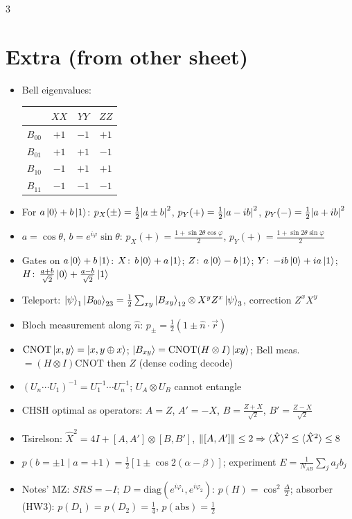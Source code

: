 \documentclass[10pt]{article}
\begin{document}
\begin{multicols*}{3}
\section{Extra (from other sheet)}
\begin{itemize}
  \item Bell eigenvalues:
  \begin{tabular}{c|ccc}
    & $XX$ & $YY$ & $ZZ$\\\hline
    $B_{00}$ & $+1$ & $-1$ & $+1$\\
    $B_{01}$ & $+1$ & $+1$ & $-1$\\
    $B_{10}$ & $-1$ & $+1$ & $+1$\\
    $B_{11}$ & $-1$ & $-1$ & $-1$
  \end{tabular}
  \item For $a\ket0+b\ket1$: $p_X(\pm)=\tfrac12\abs{a\pm b}^2$, $p_Y(+)=\tfrac12\abs{a-ib}^2$, $p_Y(-)=\tfrac12\abs{a+ib}^2$
  \item $a=\cos\theta$, $b=e^{i\varphi}\sin\theta$: $p_X(+)=\tfrac{1+\sin2\theta\cos\varphi}2$, $p_Y(+)=\tfrac{1+\sin2\theta\sin\varphi}2$
  \item Gates on $a\ket0+b\ket1$: $X\!:\,b\ket0+a\ket1$; $Z\!:\,a\ket0-b\ket1$; $Y\!:\,-ib\ket0+ia\ket1$; $H\!:\,\tfrac{a+b}{\sqrt2}\ket0+\tfrac{a-b}{\sqrt2}\ket1$
  \item Teleport: $\ket\psi_1\ket{B_{00}}_{23}=\tfrac12\sum_{xy}\ket{B_{xy}}_{12}\otimes X^yZ^x\ket\psi_3$, correction $Z^xX^y$
  \item Bloch measurement along $\hat n$: $p_\pm=\tfrac12(1\pm\hat n\cdot\vec r)$
  \item $\mathrm{CNOT}\ket{x,y}=\ket{x,y\oplus x}$; $\ket{B_{xy}}=\mathrm{CNOT}(H\otimes I)\ket{xy}$; Bell meas.\ $=(H\otimes I)\mathrm{CNOT}$ then $Z$ (dense coding decode)
  \item $(U_n\cdots U_1)^{-1}=U_1^{-1}\cdots U_n^{-1}$; $U_A\otimes U_B$ cannot entangle
  \item CHSH optimal as operators: $A=Z$, $A'=-X$, $B=\tfrac{Z+X}{\sqrt2}$, $B'=\tfrac{Z-X}{\sqrt2}$
  \item Tsirelson: $\hat X^2=4I+[A,A']\otimes[B,B']$, $\norm{[A,A']}\le2\Rightarrow\langle\hat X\rangle^2\le\langle\hat X^2\rangle\le8$
  \item $p(b=\pm1\mid a=+1)=\tfrac12[1\pm\cos2(\alpha-\beta)]$; experiment $E=\tfrac1{N_{AB}}\sum_j a_jb_j$
  \item Notes' MZ: $SRS=-I$; $D=\mathrm{diag}(e^{i\varphi_1},e^{i\varphi_2})$: $p(H)=\cos^2\tfrac\Delta2$; absorber (HW3): $p(D_1)=p(D_2)=\tfrac14$, $p(\mathrm{abs})=\tfrac12$

\end{itemize}
\end{multicols*}
\end{document}

